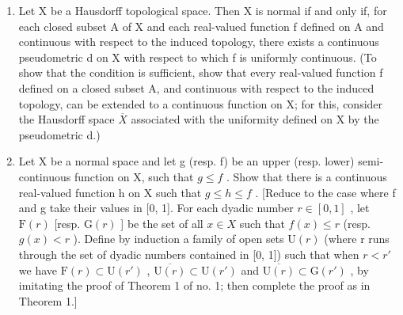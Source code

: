 \begin{enumerate}
\def\labelenumi{\arabic{enumi})}
\setcounter{enumi}{28}
\item
  Let X be a Hausdorff topological space. Then X is normal if and only if, for each closed subset A of X and each real-valued function f defined on A and continuous with respect to the induced topology, there exists a continuous pseudometric d on X with respect to which f is uniformly continuous. (To show that the condition is sufficient, show that every real-valued function f defined on a closed subset A, and continuous with respect to the induced topology, can be extended to a continuous function on X; for this, consider the Hausdorff space \(\overline{X}\) associated with the uniformity defined on X by the pseudometric d.)
\item
  Let X be a normal space and let g (resp. f) be an upper (resp. lower) semi-continuous function on X, such that \(g \leqslant f\) . Show that there is a continuous real-valued function h on X such that \(g \leqslant h \leqslant f\) . {[}Reduce to the case where f and g take their values in {[}0, 1{]}. For each dyadic number \(r \in [0, 1]\) , let \(\mathrm{F}(r)\) {[}resp. \(\mathrm{G}(r)\) {]} be the set of all \(x \in X\) such that \(f(x) \leqslant r\) (resp. \(g(x) < r\) ). Define by induction a family of open sets \(\mathrm{U}(r)\) (where r runs through the set of dyadic numbers contained in {[}0, 1{]}) such that when \(r < r'\) we have \(\mathrm{F}(r) \subset \mathrm{U}(r')\) , \(\overline{\mathrm{U}(r)} \subset \mathrm{U}(r')\) and \(\overline{\mathrm{U}(r)} \subset \mathrm{G}(r')\) , by imitating the proof of Theorem 1 of no. 1; then complete the proof as in Theorem 1.{]}
\end{enumerate}
\relax{}
